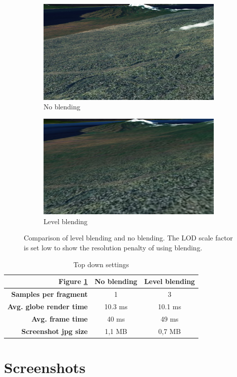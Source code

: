 \begin{figure}[h]
    \centering
    \begin{subfigure}[bt]{0.48\textwidth}
        \includegraphics[width=\textwidth]{figures/results/blending/blending_bali_disabled.jpg}
        \caption{No blending}
    \end{subfigure}
    \begin{subfigure}[bt]{0.48\textwidth}
        \includegraphics[width=\textwidth]{figures/results/blending/blending_bali_enabled.jpg}
        \caption{Level blending}
    \end{subfigure}
    \caption{Comparison of level blending and no blending. The LOD scale factor is set low to show the resolution penalty of using blending.}
    \label{fig:blending}
\end{figure}

\begin{table}
\centering
\caption[]{Top down settings}
  \label{table:settingstopdown}
  \begin{tabular}{| r | c c |}
    \hline
      \textbf{Figure \ref{fig:blending}}  & \textbf{No blending} & \textbf{Level blending} \\ \hline
      \textbf{Samples per fragment} & 1 & 3 \\ 
      \textbf{Avg. globe render time}  & 10.3 ms & 10.1 ms \\ 
      \textbf{Avg. frame time}  & 40 ms &  49 ms \\ 
      \textbf{Screenshot jpg size} & 1,1 MB & 0,7 MB \\
    \hline
  \end{tabular}
\end{table}



\section{Screenshots}
\FloatBarrier
